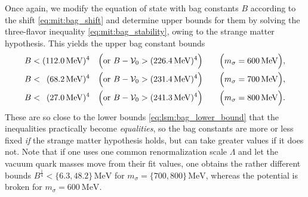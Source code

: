 Once again, we modify the equation of state with bag constants $B$ according to the shift \eqref{eq:mit:bag_shift}
and determine upper bounds for them by solving the three-flavor inequality \eqref{eq:mit:bag_stability}, owing to the strange matter hypothesis.
This yields the upper bag constant bounds
\begin{subequations}
\begin{align}
	B < (\SI{112.0}{\mega\electronvolt})^4           \quad \Big(\text{or } B-\mathcal{V}_0 > (\SI{226.4}{\mega\electronvolt})^4\Big) \qquad \Big(m_\sigma = \SI{600}{\mega\electronvolt}\Big), \label{eq:lsm3f:bag_upper_bound_600} \\
	B < \phantom{0}(\SI{68.2}{\mega\electronvolt})^4 \quad \Big(\text{or } B-\mathcal{V}_0 > (\SI{231.4}{\mega\electronvolt})^4\Big) \qquad \Big(m_\sigma = \SI{700}{\mega\electronvolt}\Big), \label{eq:lsm3f:bag_upper_bound_700} \\
	B < \phantom{0}(\SI{27.0}{\mega\electronvolt})^4 \quad \Big(\text{or } B-\mathcal{V}_0 > (\SI{241.3}{\mega\electronvolt})^4\Big) \qquad \Big(m_\sigma = \SI{800}{\mega\electronvolt}\Big). \label{eq:lsm3f:bag_upper_bound_800}
\end{align}%
\label{eq:lsm3f:bag_upper_bound}%
\end{subequations}%
These are so close to the lower bounds \eqref{eq:lsm:bag_lower_bound} that the inequalities practically become \emph{equalities},
so the bag constants are more or less fixed \emph{if} the strange matter hypothesis holds, but can take greater values if it does not.
Note that if one uses one common renormalization scale $\Lambda$ and let the vacuum quark masses move from their fit values,
one obtains the rather different bounds $B^\frac14 < \{6.3,48.2\} \, \si{\mega\electronvolt}$ for $m_\sigma=\{700,800\}\,\si{\mega\electronvolt}$,
whereas the potential is broken for $m_\sigma=\SI{600}{\mega\electronvolt}$.

